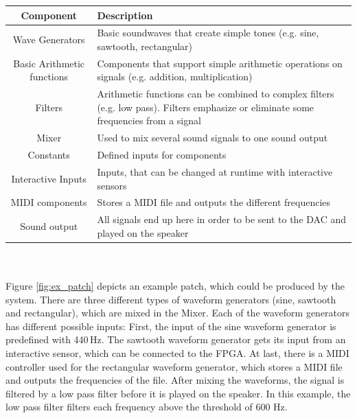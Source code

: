	 \begin{tabular}[h]{|c|p{9.75cm}|}
	  \hline
	  Component & Description \\
	  \hline
	  \hline
	  Wave Generators & Basic soundwaves that create simple tones (e.g. sine, sawtooth, rectangular) \\\hline
		Basic Arithmetic functions & Components that support simple arithmetic operations on signals (e.g. addition, multiplication)\\\hline
		Filters & Arithmetic functions can be combined to complex filters (e.g. low pass). Filters emphasize or eliminate some frequencies from a signal \\\hline
		Mixer & Used to mix several sound signals to one sound output \\\hline
		Constants & Defined inputs for components \\\hline
		Interactive Inputs & Inputs, that can be changed at runtime with interactive sensors \\\hline
		MIDI components & Stores a MIDI file and outputs the different frequencies \\\hline
		Sound output & All signals end up here in order to be sent to the \ac{DAC} and played on the speaker \\\hline
	 \end{tabular}
\\\\


Figure \ref{fig:ex_patch} depicts an example patch, which could be produced by the system. 
There are three different types of waveform generators (sine, sawtooth and rectangular), which are mixed in the Mixer. 
Each of the waveform generators has different possible inputs: 
First, the input of the sine waveform generator is predefined with 440\,Hz. 
The sawtooth waveform generator gets its input from an interactive sensor, which can be connected to the \ac{FPGA}. 
At last, there is a MIDI controller used for the rectangular waveform generator, which stores a MIDI file and outputs the frequencies of the file.
After mixing the waveforms, the signal is filtered by a low pass filter before it is played on the speaker. In this example, the low pass filter filters each frequency above the threshold of 600 Hz.

